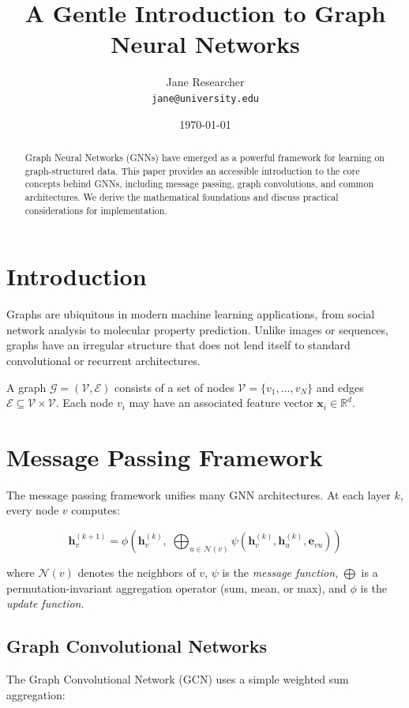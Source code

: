 \documentclass[11pt,a4paper]{article}
\title{A Gentle Introduction to Graph Neural Networks}
\author{Jane Researcher \\ \texttt{jane@university.edu}}
\date{\today}
\begin{document}
\maketitle

\begin{abstract}
Graph Neural Networks (GNNs) have emerged as a powerful framework for learning on graph-structured data.
This paper provides an accessible introduction to the core concepts behind GNNs, including message passing,
graph convolutions, and common architectures. We derive the mathematical foundations and discuss
practical considerations for implementation.
\end{abstract}

\section{Introduction}
Graphs are ubiquitous in modern machine learning applications, from social network analysis to molecular
property prediction. Unlike images or sequences, graphs have an irregular structure that does not lend
itself to standard convolutional or recurrent architectures.

A graph $\mathcal{G} = (\mathcal{V}, \mathcal{E})$ consists of a set of nodes $\mathcal{V} = \{v_1, \ldots, v_N\}$
and edges $\mathcal{E} \subseteq \mathcal{V} \times \mathcal{V}$. Each node $v_i$ may have an associated
feature vector $\mathbf{x}_i \in \mathbb{R}^d$.

\section{Message Passing Framework}
The message passing framework \cite{gilmer2017neural} unifies many GNN architectures. At each layer $k$,
every node $v$ computes:

\begin{equation}
\mathbf{h}_v^{(k+1)} = \phi\left(
    \mathbf{h}_v^{(k)},\;
    \bigoplus_{u \in \mathcal{N}(v)} \psi\left(\mathbf{h}_v^{(k)}, \mathbf{h}_u^{(k)}, \mathbf{e}_{vu}\right)
\right)
\label{eq:message_passing}
\end{equation}

where $\mathcal{N}(v)$ denotes the neighbors of $v$, $\psi$ is the \textit{message function},
$\bigoplus$ is a permutation-invariant aggregation operator (sum, mean, or max), and $\phi$ is the
\textit{update function}.

\subsection{Graph Convolutional Networks}
The Graph Convolutional Network (GCN) \cite{kipf2017semi} uses a simple weighted sum aggregation:
\end{document}
